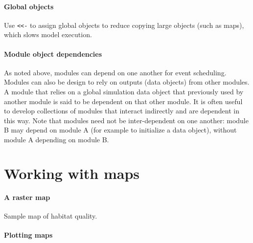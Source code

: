 \documentclass{article}
\begin{document}
\paragraph{Global objects}
Use \texttt{<<-} to assign global objects to reduce copying large objects (such as maps), which slows model execution.

\paragraph{Module object dependencies}
As noted above, modules can depend on one another for event scheduling. Modules can also be design to rely on outputs (data objects) from other modules. A module that relies on a global simulation data object that previously used by another module is said to be dependent on that other module. It is often useful to develop collections of modules that interact indirectly and are dependent in this way. Note that modules need not be inter-dependent on one another: module B may depend on module A (for example to initialize a data object), without module A depending on module B.

\newpage

\section{Working with maps}

\paragraph{A raster map}
Sample map of habitat quality.

\paragraph{Plotting maps}
\end{document}
